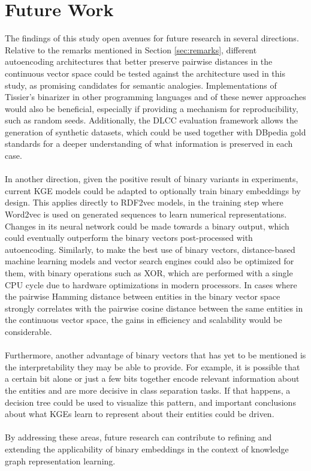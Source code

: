 \documentclass[11pt,titlepage,oneside,openany]{book}
\begin{document}
\section{Future Work}
\label{sec:future}

The findings of this study open avenues for future research in several directions. Relative to the remarks mentioned in Section \ref{sec:remarks}, different autoencoding architectures that better preserve pairwise distances in the continuous vector space could be tested against the architecture used in this study, as promising candidates for semantic analogies. Implementations of Tissier's binarizer in other programming languages and of these newer approaches would also be beneficial, especially if providing a mechanism for reproducibility, such as random seeds. Additionally, the DLCC evaluation framework allows the generation of synthetic datasets, which could be used together with DBpedia gold standards for a deeper understanding of what information is preserved in each case.\\
\\
In another direction, given the positive result of binary variants in experiments, current KGE models could be adapted to optionally train binary embeddings by design. This applies directly to RDF2vec models, in the training step where Word2vec is used on generated sequences to learn numerical representations. Changes in its neural network could be made towards a binary output, which could eventually outperform the binary vectors post-processed with autoencoding. Similarly, to make the best use of binary vectors, distance-based machine learning models and vector search engines could also be optimized for them, with binary operations such as \textsc{XOR}, which are performed with a single CPU cycle due to hardware optimizations in modern processors. In cases where the pairwise Hamming distance between entities in the binary vector space strongly correlates with the pairwise cosine distance between the same entities in the continuous vector space, the gains in efficiency and scalability would be considerable.\\
\\
Furthermore, another advantage of binary vectors that has yet to be mentioned is the interpretability they may be able to provide. For example, it is possible that a certain bit alone or just a few bits together encode relevant information about the entities and are more decisive in class separation tasks. If that happens, a decision tree could be used to visualize this pattern, and important conclusions about what KGEs learn to represent about their entities could be driven.\\
\\
By addressing these areas, future research can contribute to refining and extending the applicability of binary embeddings in the context of knowledge graph representation learning.
\end{document}
